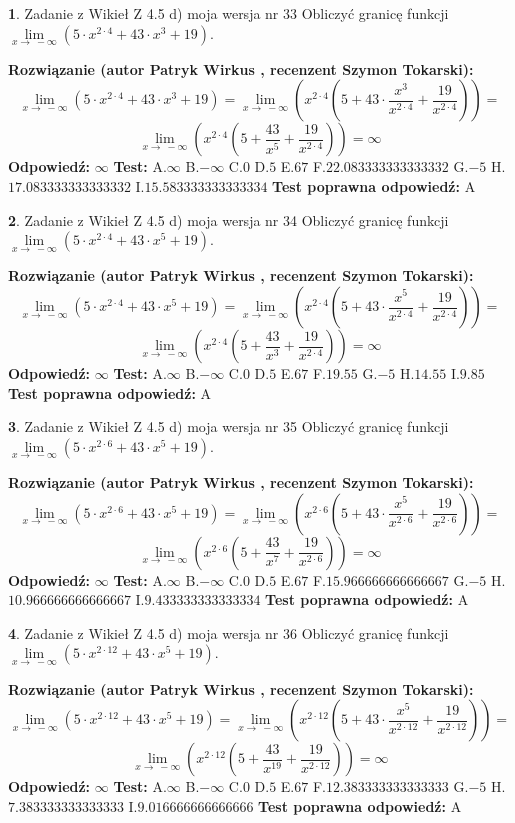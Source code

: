 \documentclass[12pt, a4paper]{article}
\theoremstyle{definition} %
\newtheorem{zad}{}
\newcommand{\zadStart}[1]{\begin{zad}#1\newline}
\newcommand{\zadStop}{\end{zad}}
\newcommand{\rozwStart}[2]{\noindent \textbf{Rozwiązanie (autor #1 , recenzent #2): }\newline}
\newcommand{\rozwStop}{\newline}
\newcommand{\odpStart}{\noindent \textbf{Odpowiedź:}\newline}
\newcommand{\odpStop}{\newline}
\newcommand{\testStart}{\noindent \textbf{Test:}\newline}
\newcommand{\testStop}{\newline}
\newcommand{\kluczStart}{\noindent \textbf{Test poprawna odpowiedź:}\newline}
\newcommand{\kluczStop}{\newline}
\begin{document}
\zadStart{Zadanie z Wikieł Z 4.5 d) moja wersja nr 33}
Obliczyć granicę funkcji  $\lim\limits_{x\to\ -\infty}(5 \cdot x^{2\cdot4}+43 \cdot x^{3}+19)$.
\zadStop
\rozwStart{Patryk Wirkus}{Szymon Tokarski}
$$\lim\limits_{x\to\ -\infty}(5 \cdot x^{2\cdot4}+43 \cdot x^{3}+19) = \lim\limits_{x\to\ -\infty}(x^{2\cdot4}(5 +43 \cdot \frac{x^{3}}{x^{2\cdot4}}+\frac{19}{x^{2\cdot4}})) =$$ $$\lim\limits_{x\to\ -\infty}(x^{2\cdot4}(5 +\frac{43}{x^{5}}+\frac{19}{x^{2\cdot4}})) =\infty$$
\rozwStop
\odpStart
$\infty$
\odpStop
\testStart
A.$\infty$ B.$-\infty$ C.$0$ D.$5$ E.$67$
F.$22.083333333333332$ G.$-5$
H.$17.083333333333332$
I.$15.583333333333334$
\testStop
\kluczStart
A
\kluczStop



\zadStart{Zadanie z Wikieł Z 4.5 d) moja wersja nr 34}
Obliczyć granicę funkcji  $\lim\limits_{x\to\ -\infty}(5 \cdot x^{2\cdot4}+43 \cdot x^{5}+19)$.
\zadStop
\rozwStart{Patryk Wirkus}{Szymon Tokarski}
$$\lim\limits_{x\to\ -\infty}(5 \cdot x^{2\cdot4}+43 \cdot x^{5}+19) = \lim\limits_{x\to\ -\infty}(x^{2\cdot4}(5 +43 \cdot \frac{x^{5}}{x^{2\cdot4}}+\frac{19}{x^{2\cdot4}})) =$$ $$\lim\limits_{x\to\ -\infty}(x^{2\cdot4}(5 +\frac{43}{x^{3}}+\frac{19}{x^{2\cdot4}})) =\infty$$
\rozwStop
\odpStart
$\infty$
\odpStop
\testStart
A.$\infty$ B.$-\infty$ C.$0$ D.$5$ E.$67$
F.$19.55$ G.$-5$
H.$14.55$
I.$9.85$
\testStop
\kluczStart
A
\kluczStop



\zadStart{Zadanie z Wikieł Z 4.5 d) moja wersja nr 35}
Obliczyć granicę funkcji  $\lim\limits_{x\to\ -\infty}(5 \cdot x^{2\cdot6}+43 \cdot x^{5}+19)$.
\zadStop
\rozwStart{Patryk Wirkus}{Szymon Tokarski}
$$\lim\limits_{x\to\ -\infty}(5 \cdot x^{2\cdot6}+43 \cdot x^{5}+19) = \lim\limits_{x\to\ -\infty}(x^{2\cdot6}(5 +43 \cdot \frac{x^{5}}{x^{2\cdot6}}+\frac{19}{x^{2\cdot6}})) =$$ $$\lim\limits_{x\to\ -\infty}(x^{2\cdot6}(5 +\frac{43}{x^{7}}+\frac{19}{x^{2\cdot6}})) =\infty$$
\rozwStop
\odpStart
$\infty$
\odpStop
\testStart
A.$\infty$ B.$-\infty$ C.$0$ D.$5$ E.$67$
F.$15.966666666666667$ G.$-5$
H.$10.966666666666667$
I.$9.433333333333334$
\testStop
\kluczStart
A
\kluczStop



\zadStart{Zadanie z Wikieł Z 4.5 d) moja wersja nr 36}
Obliczyć granicę funkcji  $\lim\limits_{x\to\ -\infty}(5 \cdot x^{2\cdot12}+43 \cdot x^{5}+19)$.
\zadStop
\rozwStart{Patryk Wirkus}{Szymon Tokarski}
$$\lim\limits_{x\to\ -\infty}(5 \cdot x^{2\cdot12}+43 \cdot x^{5}+19) = \lim\limits_{x\to\ -\infty}(x^{2\cdot12}(5 +43 \cdot \frac{x^{5}}{x^{2\cdot12}}+\frac{19}{x^{2\cdot12}})) =$$ $$\lim\limits_{x\to\ -\infty}(x^{2\cdot12}(5 +\frac{43}{x^{19}}+\frac{19}{x^{2\cdot12}})) =\infty$$
\rozwStop
\odpStart
$\infty$
\odpStop
\testStart
A.$\infty$ B.$-\infty$ C.$0$ D.$5$ E.$67$
F.$12.383333333333333$ G.$-5$
H.$7.383333333333333$
I.$9.016666666666666$
\testStop
\kluczStart
A
\kluczStop
\end{document}
